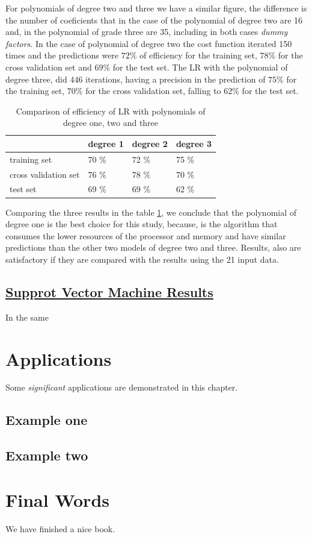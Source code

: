 \documentclass[]{book}
\begin{document}
For polynomials of degree two and three we have a similar figure, the
difference is the number of coeficients that in the case of the
polynomial of degree two are 16 and, in the polynomial of grade three
are 35, including in both cases \emph{dummy factors}. In the case of
polynomial of degree two the cost function iterated 150 times and the
predictions were \(72\%\) of efficiency for the training set, \(78\%\)
for the cross validation set and \(69\%\) for the test set. The LR with
the polynomial of degree three, did 446 iterations, having a precision
in the prediction of \(75\%\) for the training set, \(70\%\) for the
cross validation set, falling to \(62\%\) for the test set.

\begin{table}[ht]
\centering
\caption{Comparison of efficiency of LR with polynomials of degree one, two and three}
\label{tab:results-of-efficiency-logistic-regression}
\begin{tabular}{llll}
\hline
                     & degree 1 & degree 2 & degree 3 \\ \hline
training set         & 70 \%    & 72 \%    & 75 \%    \\
cross validation set & 76 \%    & 78 \%    & 70 \%    \\
test set             & 69 \%    & 69 \%    & 62 \%    \\ \hline
\end{tabular}
\end{table}

Comparing the three results in the table
\ref{tab:results-of-efficiency-logistic-regression}, we conclude that
the polynomial of degree one is the best choice for this study, because,
is the algorithm that consumes the lower resources of the processor and
memory and have similar predictions than the other two models of degree
two and three. Results, also are satisfactory if they are compared with
the results using the 21 input data.

\section{\texorpdfstring{\protect\hyperlink{SVM-results}{Supprot Vector
Machine
Results}}{Supprot Vector Machine Results}}\label{supprot-vector-machine-results}

In the same

\chapter{Applications}\label{applications}

Some \emph{significant} applications are demonstrated in this chapter.

\section{Example one}\label{example-one}

\section{Example two}\label{example-two}

\chapter{Final Words}\label{final-words}

We have finished a nice book.


\end{document}
